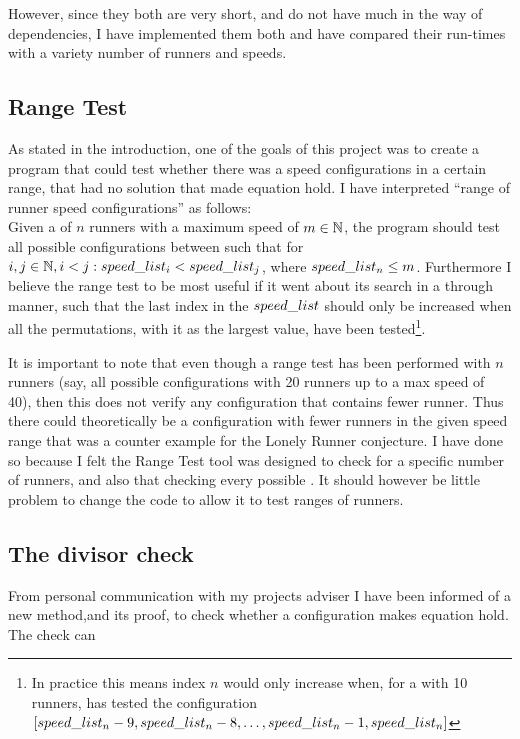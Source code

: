 However, since they both are very short, and do not have much in the way of dependencies, I have implemented them both and have compared their run-times with a variety number of runners and speeds.\\

\subsection{Range Test}
As stated in the introduction, one of the goals of this project was to create a program that could test whether there was a speed configurations in a certain range, that had no solution that made equation  hold. I have interpreted ``range of runner speed configurations'' as follows:\\

Given a \comS of $n$ runners with a maximum speed of $m \in \mathbb{N}$, the program should test all possible configurations between such that for $i, j \in \mathbb{N}, i < j: speed\_list_i < speed\_list_j$, where $speed\_list_n \leq m$. Furthermore I believe the range test to be most useful if it went about its search in a through manner, such that the last index in the $speed\_list$ should only be increased when all the permutations, with it as the largest value, have been tested\footnote{In practice this means index $n$ would only increase when, for a \comS with 10 runners, has tested the configuration $[speed\_list_n - 9, speed\_list_n - 8, \ldots, speed\_list_n - 1, speed\_list_n]$}. 

It is important to note that even though a range test has been performed with $n$ runners (say, all possible configurations with 20 runners up to a max speed of 40), then this does not verify any configuration that contains fewer runner. Thus there could theoretically be a configuration with fewer runners in the given speed range that was a counter example for the Lonely Runner conjecture. I have done so because I felt the Range Test tool was designed to check for a specific number of runners, and also that checking every possible   . It should however be little problem to change the code to allow it to test ranges of runners. 

\subsection{The divisor check}
\label{detect}
From personal communication with my projects adviser I have been informed of a new method,and its proof, to check whether a configuration makes equation  hold. The check can 

